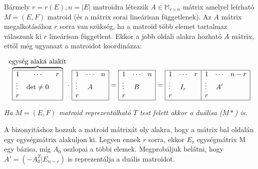 Bármely $r=r(E), n=|E|$ matroidra létezzik $A \in \mathbb{M}_{r\times n}$ mátrix
amelyel leírható $M=(E,F)$ matroid (és a mátrix sorai lineárisan függetlenek).
Az $A$ mátrix megalkotásához $r$ sorra van szükség, ha a matroid több elemet
tartalmaz válaszunk ki $r$ lineárisan függetlent. Ekkor a jobb oldali alakra
hozható $A$ mátrix, ettől még ugyanazt a matroidot koordinázza:

\[
\overbrace{
\begin{array}{|lcr|}
\hline
1 & \cdots & r\\
\vdots  & \mbox{det} \neq 0 &\\
r &  & \\
\hline
\end{array}}^{\mbox{egység alaká alakít}}
\cdot~
\begin{array}{|lcr|}
\hline
1 & \cdots & n\\
\vdots  & A &\\
r &  & \\
\hline
\end{array}
=
\begin{array}{|lcr|}
\hline
1 & \cdots & n\\
\vdots  & B &\\
r &  & \\
\hline
\end{array}
=
\begin{array}{|lcr|lcr|}
\hline
1 & \cdots & r &1&\cdots&n-r\\
\vdots  & I_r &&\vdots&A'&\\
r &  & & r&&\\
\hline
\end{array}
\]

\emph{Ha $M=(E,F)$ matroid reprezentálható $T$ test felett akkor a duálisa ($M*$) is.}

A bizonyitáshoz hozzuk a matroid mátrixát oly alakra, hogy a mátrix bal oldalán
egy egységmátrix alakuljon ki. Legyen ennek $r$ sorra, ekkor $E_r$ egységmátrix
M egy bázisa, míg $A_0$ oszlopai a többi elemek. Megprobáljuk belátni, hogy $A'=(-A_0^T|E_{n-r})$
is reprezentálja a duális matroidot.

